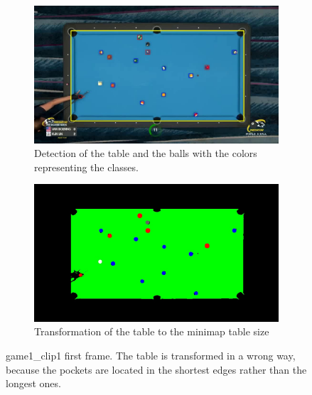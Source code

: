 \begin{figure}[H]
	\centering
	\begin{subfigure}[b]{0.48\textwidth}
		\centering
		\includegraphics[width=\textwidth]{images/TableOrientation/g1_c1.jpg}
		\caption{Detection of the table and the balls with the colors representing the classes.}
	\end{subfigure}
	\begin{subfigure}[b]{0.48\textwidth}
		\centering
		\includegraphics[width=\textwidth]{images/Segmentation/game1_clip1_segmented_balls_first_frame.jpg}
		\caption{Transformation of the table to the minimap table size}
	\end{subfigure}
	\caption{game1\_clip1 first frame. The table is transformed in a wrong way, because the pockets are located in the shortest edges rather than the longest ones.}
	\label{fig:game1_clip1_orientation}
\end{figure}

